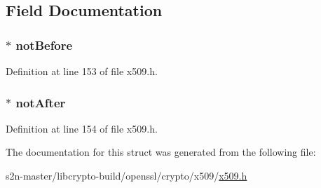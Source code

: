 \subsection{Field Documentation}
\subsubsection[{\texorpdfstring{not\+Before}{notBefore}}]{ $\ast$ not\+Before}\hypertarget{struct_x509__val__st_abdd751f34fa092666b6132ec25a8ed08}{}\label{struct_x509__val__st_abdd751f34fa092666b6132ec25a8ed08}


Definition at line 153 of file x509.\+h.

\subsubsection[{\texorpdfstring{not\+After}{notAfter}}]{ $\ast$ not\+After}\hypertarget{struct_x509__val__st_a93918a5f18098406d632d394043eefc3}{}\label{struct_x509__val__st_a93918a5f18098406d632d394043eefc3}


Definition at line 154 of file x509.\+h.



The documentation for this struct was generated from the following file\+:\begin{DoxyCompactItemize}
\item 
s2n-\/master/libcrypto-\/build/openssl/crypto/x509/\hyperlink{crypto_2x509_2x509_8h}{x509.\+h}\end{DoxyCompactItemize}
